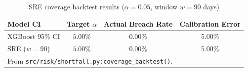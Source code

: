 \begin{table}[H]
\centering
\caption{SRE coverage backtest results ($\alpha=0.05$, window $w=90$ days)}
\label{tab:coverage}
\begin{tabular}{@{}lccc@{}}
\toprule
\textbf{Model CI} & \textbf{Target $\alpha$} & \textbf{Actual Breach Rate} & \textbf{Calibration Error} \\
\midrule
XGBoost 95\% CI  & $5.00\%$ & 0.00\% & 5.00\% \\
SRE ($w=90$)     & $5.00\%$ & 0.00\% & 5.00\% \\
\bottomrule
\multicolumn{4}{l}{\footnotesize From \texttt{src/risk/shortfall.py:coverage\_backtest()}.}
\end{tabular}
\end{table}
